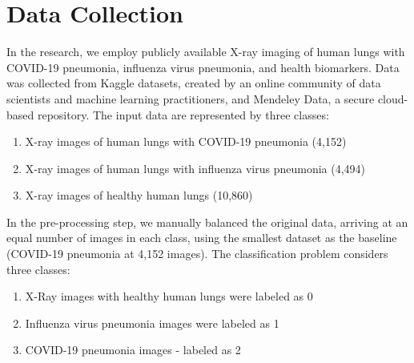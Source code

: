 \documentclass[12pt, twocolumn]{CUP-JNL-PPS}
\begin{document}
\section{Data Collection}
In the research, we employ publicly available X-ray imaging of human
lungs with COVID-19 pneumonia, influenza virus pneumonia, and health biomarkers. Data was collected from Kaggle datasets, created by an online community of
data scientists and machine learning practitioners, and Mendeley Data, a secure
cloud-based repository. The input data are represented by three classes:

\begin{enumerate}
\item X-ray images of human lungs with COVID-19 pneumonia (4,152)
\item X-ray images of human lungs with influenza virus pneumonia (4,494)
\item X-ray images of healthy human lungs (10,860)
\end{enumerate}

In the pre-processing step, we manually balanced the original data, arriving at an equal number of images in each class, using the smallest dataset as the baseline (COVID-19 pneumonia at 4,152 images). The classification problem considers three classes:
\begin{enumerate}
\item 	X-Ray images with healthy human lungs were labeled as 0
\item 	Influenza virus pneumonia images were labeled as 1
\item 	COVID-19 pneumonia images - labeled as 2
\end{enumerate}
\end{document}
